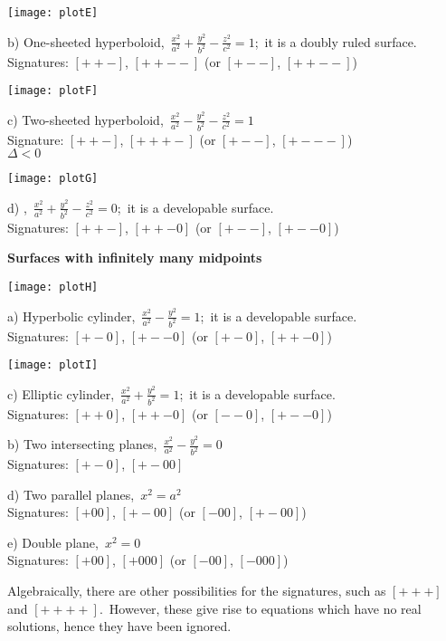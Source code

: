 \documentclass[12pt]{article}
\begin{document}
\begin{center}
\texttt{[image: plotE]}

b) One-sheeted hyperboloid, 
\,$\frac{x^2}{a^2}+\frac{y^2}{b^2}-\frac{z^2}{c^2} = 1$;\, it is a doubly ruled  surface. \\
Signatures: $[++-]$, $[++--]$ (or $[+--]$, $[++--]$)
\end{center}
\bigskip

\begin{center}
\texttt{[image: plotF]}

c) Two-sheeted hyperboloid,
 \,$\frac{x^2}{a^2}-\frac{y^2}{b^2}-\frac{z^2}{c^2} = 1$ \\
Signature: $[++-]$, $[+++-]$ (or $[+--]$, $[+---]$) \\
$\Delta < 0$
\end{center}
\bigskip

\begin{center}
\texttt{[image: plotG]}

d) , \,$\frac{x^2}{a^2}+\frac{y^2}{b^2}-\frac{z^2}{c^2} = 0$;\, it is a developable surface. \\
Signatures: $[++-]$, $[++-0]$ (or $[+--]$, $[+--0]$) 
\end{center}
\bigskip

\textbf{Surfaces with infinitely many midpoints}

\begin{center}
\texttt{[image: plotH]}

a) Hyperbolic cylinder, \,$\frac{x^2}{a^2}-\frac{y^2}{b^2} = 1$;\, it is a developable surface. \\
Signatures: $[+-0]$, $[+--0]$ (or $[+-0]$, $[++-0]$) 
\end{center}
\bigskip

\begin{center}
\texttt{[image: plotI]}

c) Elliptic cylinder, \,$\frac{x^2}{a^2}+\frac{y^2}{b^2} = 1$;\, it is a developable surface. \\
Signatures: $[++0]$, $[++-0]$ (or $[--0]$, $[+--0]$)
\end{center}
\bigskip

b) Two intersecting planes, \,$\frac{x^2}{a^2}-\frac{y^2}{b^2} = 0$ \\
Signatures: $[+-0]$, $[+-00]$

d) Two parallel planes, \,$x^2 = a^2$ \\
Signatures: $[+00]$, $[+-00]$ (or $[-00]$, $[+-00]$)

e) Double plane, \,$x^2 = 0$ \\
Signatures: $[+00]$, $[+000]$ (or $[-00]$, $[-000]$)

Algebraically, there are other possibilities for the signatures, such as $[+++]$ and $[++++]$.\, However, these give rise to equations which have no real solutions, hence they have been ignored.
\end{document}
